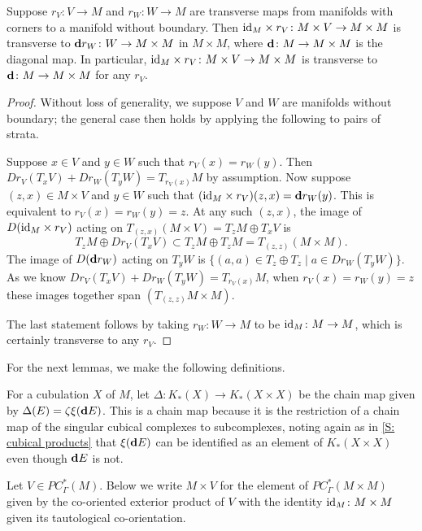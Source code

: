 \begin{lemma}\label{L: M times transverse diag}
	Suppose $r_V \colon V \to M$ and $r_W \colon W \to M$ are transverse maps from manifolds with corners to a manifold without boundary.
	Then $\mathrm{id}_M \times r_V \colon M \times V \to M \times M$ is transverse to $\mathbf{d} r_W \colon W \to M \times M$ in $M \times M$, where $\mathbf{d} \colon M \to M \times M$ is the diagonal map.
	In particular, $\mathrm{id}_M \times r_V \colon M \times V \to M \times M$ is transverse to $\mathbf{d} \colon M \to M \times M$ for any $r_V$.
\end{lemma}

\begin{proof}
	Without loss of generality, we suppose $V$ and $W$ are manifolds without boundary; the general case then holds by applying the following to pairs of strata.

	Suppose $x \in V$ and $y \in W$ such that $r_V(x) = r_W(y)$.
	Then $Dr_V(T_xV)+Dr_W(T_yW) = T_{r_V(x)}M$ by assumption.
	Now suppose $(z,x) \in M \times V$ and $y \in W$ such that $(\mathrm{id}_M \times r_V) (z,x) = \mathbf{d} r_W(y)$.
	This is equivalent to $r_V(x) = r_W(y) = z$.
	At any such $(z,x)$, the image of $D(\mathrm{id}_M \times r_V)$ acting on $T_{(z,x)}(M \times V) = T_zM \oplus T_xV$ is $$T_zM \oplus Dr_V(T_xV) \subset T_zM \oplus T_zM = T_{(z,z)}(M \times M).$$
	The image of $D(\mathbf{d} r_W)$ acting on $T_yW$ is $\{(a,a) \in T_z \oplus T_z \mid a \in Dr_W(T_yW)\}$.
	As we know $Dr_V(T_xV)+Dr_W(T_yW) = T_{r_V(x)}M$, when $r_V(x) = r_W(y) = z$ these images together span $(T_{(z,z)}M \times M)$.

	The last statement follows by taking $r_W \colon W \to M$ to be $\mathrm{id}_M \colon M \to M$, which is certainly transverse to any $r_V$.
\end{proof}

For the next lemmas, we make the following definitions.

\begin{definition}\label{D: Delta}
	For a cubulation $X$ of $M$, let $\Delta \colon K_*(X) \to K_*(X \times X)$ be the chain map given by $\Delta(E) = \zeta\xi(\mathbf{d} E)$.
	This is a chain map because it is the restriction of a chain map of the singular cubical complexes to subcomplexes, noting again as in \cref{S: cubical products} that $\xi(\mathbf{d} E)$ can be identified as an element of $K_*(X \times X)$ even though $\mathbf{d} E$ is not.
\end{definition}

\begin{definition}
	Let $V \in PC^*_\Gamma(M)$.
	Below we write $M \times V$ for the element of $PC^*_\Gamma(M \times M)$ given by the co-oriented exterior product of $V$ with the identity $\mathrm{id}_M \colon M \times M$ given its tautological co-orientation.
\end{definition}

